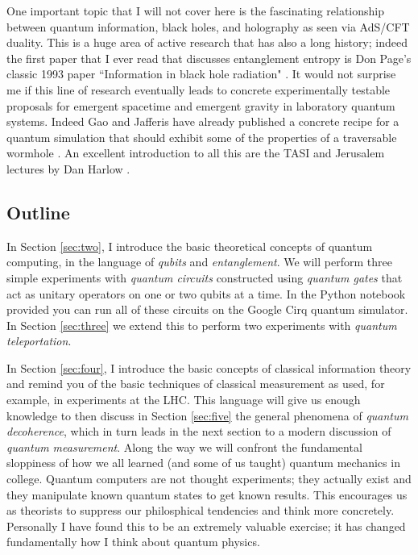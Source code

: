 \documentclass[a4paper,11pt]{article}
\begin{document}
One important topic that I will not cover here is the fascinating relationship between quantum information, black holes, and holography as seen via AdS/CFT
duality. This is a huge area of active research that has also a long history; indeed the first paper that I ever read that discusses entanglement entropy is
Don Page's classic 1993 paper ``Information in black hole radiation"  \cite{Page:1993wv}. It would not surprise me if this line of research eventually leads
to concrete experimentally testable proposals for emergent spacetime and emergent gravity in laboratory quantum systems. Indeed Gao and Jafferis
have already published a concrete recipe for a quantum simulation that should exhibit some of the properties of a traversable wormhole \cite{Gao:2019nyj}. 
An excellent introduction to all
this are the TASI and Jerusalem lectures by Dan Harlow \cite{Harlow:2018fse,Harlow:2014yka}.

\subsection{Outline}
In Section \ref{sec:two}, I introduce the basic theoretical concepts of quantum computing, in the language of {\it qubits} and {\it entanglement}.
We will perform three simple experiments with {\it quantum circuits} constructed using {\it quantum gates} that act as
unitary operators on one or two qubits at a time. In the Python notebook provided you can run all of these circuits on the Google Cirq
quantum simulator. In Section \ref{sec:three} we extend this to perform two experiments with {\it quantum teleportation}.

In Section \ref{sec:four}, I introduce the basic concepts of classical information theory and remind you of the basic techniques of classical measurement
as used, for example, in experiments at the LHC.
This language will give us enough knowledge to then discuss in Section \ref{sec:five} the general phenomena
of {\it quantum decoherence}, which in turn leads in the next section to a modern discussion of {\it quantum measurement}.
Along the way we will confront the fundamental
sloppiness of how we all learned (and some of us taught) quantum mechanics in college. Quantum computers are not thought experiments; they actually exist
and they manipulate known quantum states to get known results. This encourages us as theorists to suppress our philosphical tendencies and think more concretely.
Personally I have found this to be an extremely valuable exercise; it has changed fundamentally how I think about quantum physics.
\end{document}
